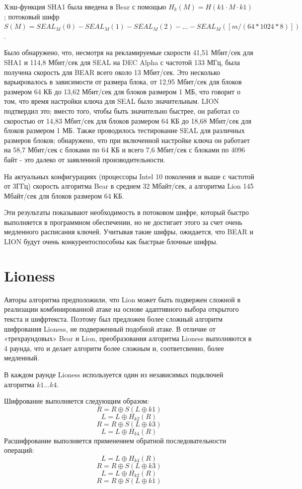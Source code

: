 \documentclass[12pt]{article}
\begin{document}
Хэш-функция SHA1 была введена в Bear с помощью $H_{k}(M) = {H(k1\cdot M \cdot k1)}$; потоковый шифр $S(M) = SEAL_{M}(0) - SEAL_{M}(1) - SEAL_{M}(2) - ... - SEAL_{M}([m/(64*1024*8)])$.

Было обнаружено, что, несмотря на рекламируемые скорости 41,51 Мбит/сек для SHA1 и 114,8 Мбит/сек для SEAL на DEC Alpha с частотой 133 МГц, была получена скорость для BEAR всего около 13 Мбит/сек. Это несколько варьировалось в зависимости от размера блока, от 12,95 Мбит/сек для блоков размером 64 КБ до 13,62 Мбит/сек для блоков размером 1 МБ, что говорит о том, что время настройки ключа для SEAL было значительным. LION подтвердил это; вместо того, чтобы быть значительно быстрее, он работал со скоростью от 14,83 Мбит/сек для блоков размером 64 КБ до 18,68 Мбит/сек для блоков размером 1 МБ. Также проводилось тестирование SEAL для различных размеров блоков; обнаружено, что при включенной настройке ключа он работает на 58,7 Мбит/сек с блоками по 64 КБ и всего 7,6 Мбит/сек с блоками по 4096 байт - это далеко от заявленной производительности. 

На актуальных конфигурациях (процессоры Intel 10 поколения и выше с частотой от 3ГГц) скорость алгоритма Bear в среднем 32 Мбайт/сек, а алгоритма Lion 145 Мбайт/сек для блоков размером 64 КБ.

Эти результаты показывают необходимость в потоковом шифре, который быстро выполняется в программном
обеспечении, но не достигает этого за счет очень медленного расписания ключей. Учитывая такие шифры, ожидается, что BEAR и LION будут очень конкурентоспособны как быстрые блочные шифры.

\section{Lioness}

Авторы алгоритма предположили, что Lion может быть подвержен сложной в реализации комбинированной атаке на основе адаптивного выбора открытого текста и шифртекста. Поэтому был предложен более сложный алгоритм шифрования Lioness, не подверженный подобной атаке. В отличие от «трехраундовых» Bear и Lion, преобразования алгоритма
Lioness выполняются в 4 раунда, что и делает алгоритм более сложным и, соответсвенно, более медленный.

В каждом раунде Lioness используется один из независимых подключей алгоритма $k1...k4$. 

Шифрование выполняется следующим образом:
\[R = R\oplus S(L\oplus k1)\]
\[L = L\oplus H_{k2}(R)\]
\[R = R\oplus S(L\oplus k3)\]
\[L = L\oplus H_{k4}(R)\]
\newpage
Расшифрование выполняется применением обратной последовательности операций:
\[L = L\oplus H_{k4}(R)\]
\[R = R\oplus S(L\oplus k3)\]
\[L = L\oplus H_{k2}(R)\]
\[R = R\oplus S(L\oplus k1)\]
\end{document}
